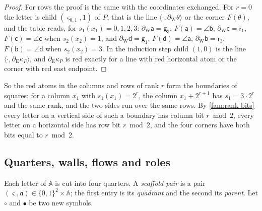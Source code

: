 \begin{proof}
For rows the proof is the same with the coordinates exchanged. For $r=0$ the letter is child $(\varsigma_{0,1},1)$ of $P$, that is the line $\langle\cdot,\partial_{\mathrm W}\theta\rangle$ or the corner $F(\theta)$, and the table reads, for $s_1(x_1)=0,1,2,3$: $\partial_{\mathrm W}\mathsf a=\mathsf g_3$, $F(\mathsf a)=\angle\mathsf b$, $\partial_{\mathrm W}\mathsf c=\mathsf r_1$, $F(\mathsf c)=\angle\mathsf c$ when $s_2(x_2)=1$, and $\partial_{\mathrm W}\mathsf d=\mathsf g_1$, $F(\mathsf d)=\angle\mathsf a$, $\partial_{\mathrm W}\mathsf b=\mathsf r_3$, $F(\mathsf b)=\angle\mathsf d$ when $s_2(x_2)=3$. In the induction step child $(1,0)$ is the line $\langle\cdot,\partial_{\mathrm E}\kappa_P\rangle$, and $\partial_{\mathrm E}\kappa_P$ is red exactly for a line with red horizontal atom or the corner with red east endpoint.
\end{proof}

So the red atoms in the columns and rows of rank $r$ form the boundaries of squares: for a column $x_1$ with $s_1(x_1)=2^r$, the column $x_1+2^{r+1}$ has $s_1=3\cdot2^r$ and the same rank, and the two sides run over the same rows. By \cref{fam:rank-bits} every letter on a vertical side of such a boundary has column bit $r\bmod2$, every letter on a horizontal side has row bit $r\bmod2$, and the four corners have both bits equal to $r\bmod2$.

\subsection{Quarters, walls, flows and roles}\label{fam:sub-walls}

Each letter of $\mathbb A$ is cut into four quarters. A \emph{scaffold pair} is a pair $(\varsigma,\mathfrak a)\in\{0,1\}^2\times\mathbb A$; the first entry is its \emph{quadrant} and the second its \emph{parent}. Let $\circ$ and $\bullet$ be two new symbols.

